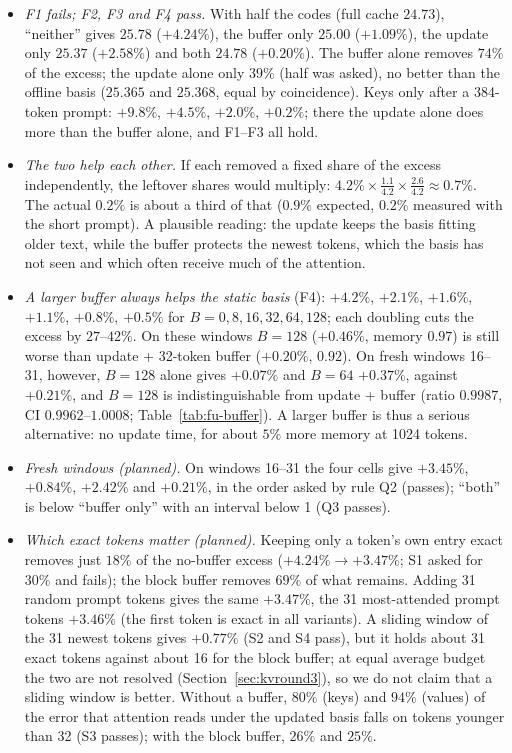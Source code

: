 \documentclass[10pt]{article}
\theoremstyle{plain}
\theoremstyle{definition}
\theoremstyle{remark}
\newcommand{\rl}[1]{\textsf{#1}}%
\begin{document}
\begin{itemize}[leftmargin=2em,itemsep=1pt]
\item \emph{\rl{F1} fails; \rl{F2}, \rl{F3} and \rl{F4} pass.} With half the codes (full cache $24.73$), ``neither'' gives $25.78$ ($+4.24\%$), the buffer only $25.00$ ($+1.09\%$), the update only $25.37$ ($+2.58\%$) and both $24.78$ ($+0.20\%$). The buffer alone removes $74\%$ of the excess; the update alone only $39\%$ (half was asked), no better than the offline basis ($25.365$ and $25.368$, equal by coincidence). Keys only after a 384-token prompt: $+9.8\%$, $+4.5\%$, $+2.0\%$, $+0.2\%$; there the update alone does more than the buffer alone, and \rl{F1}--\rl{F3} all hold.
\item \emph{The two help each other.} If each removed a fixed share of the excess independently, the leftover shares would multiply: $4.2\%\times\frac{1.1}{4.2}\times\frac{2.6}{4.2}\approx0.7\%$. The actual $0.2\%$ is about a third of that ($0.9\%$ expected, $0.2\%$ measured with the short prompt). A plausible reading: the update keeps the basis fitting older text, while the buffer protects the newest tokens, which the basis has not seen and which often receive much of the attention.
\item \emph{A larger buffer always helps the static basis} (\rl{F4}): $+4.2\%$, $+2.1\%$, $+1.6\%$, $+1.1\%$, $+0.8\%$, $+0.5\%$ for $B=0,8,16,32,64,128$; each doubling cuts the excess by $27$--$42\%$. On these windows $B=128$ ($+0.46\%$, memory $0.97$) is still worse than update + 32-token buffer ($+0.20\%$, $0.92$). On fresh windows 16--31, however, $B=128$ alone gives $+0.07\%$ and $B=64$ $+0.37\%$, against $+0.21\%$, and $B=128$ is indistinguishable from update + buffer (ratio $0.9987$, CI $0.9962$--$1.0008$; Table~\ref{tab:fu-buffer}). A larger buffer is thus a serious alternative: no update time, for about $5\%$ more memory at 1024 tokens.
\item \emph{Fresh windows (planned).} On windows 16--31 the four cells give $+3.45\%$, $+0.84\%$, $+2.42\%$ and $+0.21\%$, in the order asked by rule \rl{Q2} (passes); ``both'' is below ``buffer only'' with an interval below 1 (\rl{Q3} passes).
\item \emph{Which exact tokens matter (planned).} Keeping only a token's own entry exact removes just $18\%$ of the no-buffer excess ($+4.24\%\to+3.47\%$; \rl{S1} asked for $30\%$ and fails); the block buffer removes $69\%$ of what remains. Adding 31 random prompt tokens gives the same $+3.47\%$, the 31 most-attended prompt tokens $+3.46\%$ (the first token is exact in all variants). A sliding window of the 31 newest tokens gives $+0.77\%$ (\rl{S2} and \rl{S4} pass), but it holds about 31 exact tokens against about 16 for the block buffer; at equal average budget the two are not resolved (Section~\ref{sec:kvround3}), so we do not claim that a sliding window is better. Without a buffer, $80\%$ (keys) and $94\%$ (values) of the error that attention reads under the updated basis falls on tokens younger than 32 (\rl{S3} passes); with the block buffer, $26\%$ and $25\%$.

\end{itemize}
\end{document}
